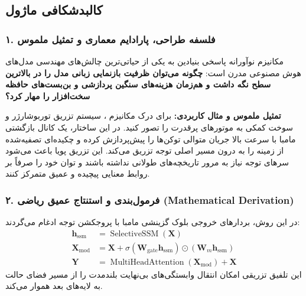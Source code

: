 \subsection{کالبدشکافی ماژول }

\subsubsection*{۱. فلسفه طراحی، پارادایم معماری و تمثیل ملموس}
مکانیزم نوآورانه  پاسخی بنیادین به یکی از حیاتی‌ترین چالش‌های مهندسی مدل‌های هوش مصنوعی مدرن است: \textbf{چگونه می‌توان ظرفیت بازنمایی زبانی مدل را در بالاترین سطح نگه داشت و هم‌زمان هزینه‌های سنگین پردازشی و بن‌بست‌های حافظه سخت‌افزار را مهار کرد؟}

\textbf{تمثیل ملموس و مثال کاربردی:}
برای درک مکانیزم ، سیستم تزریق توربوشارژر و سوخت کمکی به موتورهای پرقدرت را تصور کنید. در این ساختار، یک کانال بازگشتی مامبا با سرعت بالا جریان متوالی توکن‌ها را پیش‌پردازش کرده و چکیده‌ای تصفیه‌شده از زمینه را به درون مسیر اصلی توجه تزریق می‌کند. این تزریق پویا باعث می‌شود سرهای توجه نیاز به مرور تاریخچه‌های طولانی نداشته باشند و توان خود را صرفاً بر روابط معنایی پیچیده و عمیق متمرکز کنند.

\subsubsection*{۲. فرمول‌بندی و استنتاج عمیق ریاضی (Mathematical Derivation)}
در این روش، بردارهای خروجی بلوک گزینشی مامبا با پروجکشن توجه ادغام می‌گردند:
\begin{align}
\mathbf{h}_{\text{ssm}} &= \operatorname{SelectiveSSM}(\mathbf{X}) \\
\mathbf{X}_{\text{mod}} &= \mathbf{X} + \sigma(\mathbf{W}_{\text{gate}} \mathbf{h}_{\text{ssm}}) \odot (\mathbf{W}_m \mathbf{h}_{\text{ssm}}) \\
\mathbf{Y} &= \operatorname{MultiHeadAttention}(\mathbf{X}_{\text{mod}}) + \mathbf{X}
\end{align}
این تلفیق تزریقی امکان انتقال وابستگی‌های بی‌نهایت بلندمدت را از مسیر فضای حالت به لایه‌های بعد هموار می‌کند.

